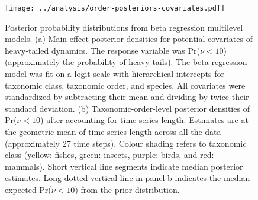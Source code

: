 \begin{figure}[htbp]
\begin{center}
\texttt{[image: ../analysis/order-posteriors-covariates.pdf]}
\caption{
Posterior probability distributions from beta regression multilevel models.
(a) Main effect posterior densities for potential covariates of heavy-tailed dynamics. The response variable was Pr($\nu < 10$) (approximately the probability of heavy tails). The beta regression model was fit on a logit scale with hierarchical intercepts for taxonomic class, taxonomic order, and species. All covariates were standardized by subtracting their mean and dividing by twice their standard deviation.
(b) Taxonomic-order-level posterior densities of Pr($\nu < 10$) after accounting for time-series length. Estimates are at the geometric mean of time series length across all the data (approximately 27 time steps). Colour shading refers to taxonomic class (yellow: fishes, green: insects, purple: birds, and red: mammals). Short vertical line segments indicate median posterior estimates. Long dotted vertical line in panel b indicates the median expected Pr($\nu < 10$) from the prior distribution.
}
\label{fig:posteriors}
\end{center}
\end{figure}
